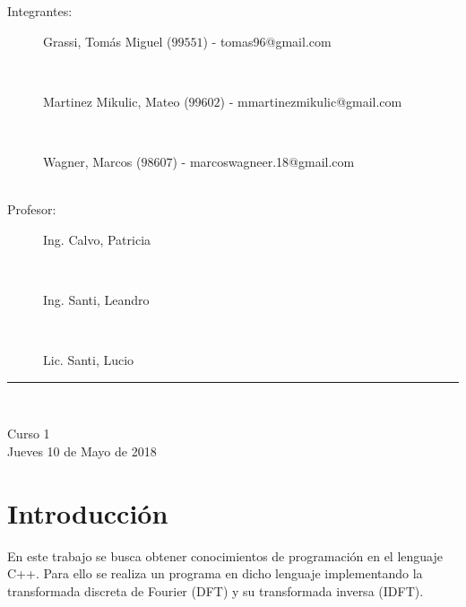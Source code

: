 \documentclass[12pt,a4paper]{report}
\begin{document}
\begin{titlepage}
\begin{center}
			\begin{large}
				\begin{description}
					\item[\hspace{0.15 cm}Integrantes:]
						Grassi, Tomás Miguel ($99551$) - tomas96@gmail.com 					
					\item[\hspace{0.15 cm}\textcolor{white}{Integrantes:}]
						Martinez Mikulic, Mateo ($99602$) - mmartinezmikulic@gmail.com
					\item[\hspace{0.15 cm}\textcolor{white}{Integrantes:}]
						Wagner, Marcos ($98607$) - marcoswagneer.18@gmail.com
					\item[\hspace{1.4 cm}\textcolor{white}{aux}]
					\item[\hspace{0.10 cm}Profesor:]
						Ing. Calvo, Patricia
					\item[\hspace{0.10 cm}\textcolor{white}{Profesor:}]	
						Ing. Santi, Leandro
					\item[\hspace{0.10 cm}\textcolor{white}{Profesor:}]	
						Lic. Santi, Lucio
				\end{description}
			\end{large}
			
		
		\vspace*{0.8 cm}
	
		\rule{80mm}{0.1mm}\\
	
		\vspace*{0.1in}
	
			\begin{large}
				Curso 1 \\
				Jueves 10 de Mayo de 2018 \\
			\end{large}
		
	\end{center}

\end{titlepage}		

	\section{Introducción}	
		
		\indent En este trabajo se busca obtener conocimientos de programación en el lenguaje C++. Para ello se
		realiza un programa en dicho lenguaje implementando la transformada discreta de Fourier (DFT) y su transformada
		inversa (IDFT).
		
\end{document}
